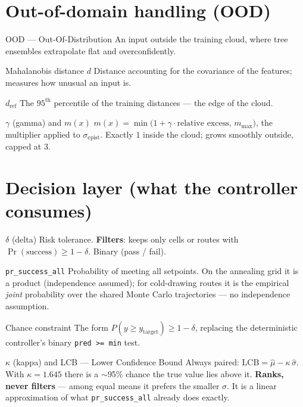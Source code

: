\documentclass[11pt,a4paper]{article}
\newcommand{\code}[1]{\texttt{\small #1}}
\newenvironment{terms}
  {\begin{description}[style=unboxed,leftmargin=1.2em,itemsep=0.45em,parsep=0pt,
                       font=\normalfont\bfseries]}
  {\end{description}}
\begin{document}
\section{Out-of-domain handling (OOD)}

\begin{terms}
  \item[OOD --- Out-Of-Distribution] An input outside the training cloud, where
    tree ensembles extrapolate flat and overconfidently.

  \item[Mahalanobis distance $d$] Distance accounting for the covariance of
    the features; measures how unusual an input is.

  \item[$d_{\text{ref}}$] The $95^{\text{th}}$ percentile of the training
    distances --- the edge of the cloud.

  \item[$\gamma$ (gamma) and $m(x)$]
    $m(x) = \min\!\big(1 + \gamma \cdot \text{relative excess},\,
    m_{\max}\big)$, the multiplier applied to $\sigma_{\text{epist}}$. Exactly
    $1$ inside the cloud; grows smoothly outside, capped at $3$.
\end{terms}

\section{Decision layer (what the controller consumes)}

\begin{terms}
  \item[$\delta$ (delta)] Risk tolerance. \textbf{Filters}: keeps only cells or
    routes with $\Pr(\text{success}) \ge 1 - \delta$. Binary (pass / fail).

  \item[\code{pr\_success\_all}] Probability of meeting all setpoints. On the
    annealing grid it is a product (independence assumed); for cold-drawing
    routes it is the empirical \emph{joint} probability over the shared Monte
    Carlo trajectories --- no independence assumption.

  \item[Chance constraint] The form $P(y \ge y_{\text{target}}) \ge 1-\delta$,
    replacing the deterministic controller's binary
    \code{pred >= min} test.

  \item[$\kappa$ (kappa) and LCB --- Lower Confidence Bound]
    Always paired: $\mathrm{LCB} = \hat\mu - \kappa\,\hat\sigma$. With
    $\kappa = 1.645$ there is a $\sim$95\% chance the true value lies above it.
    \textbf{Ranks, never filters} --- among equal means it prefers the smaller
    $\sigma$. It is a linear approximation of what \code{pr\_success\_all}
    already does exactly.
\end{terms}
\end{document}
